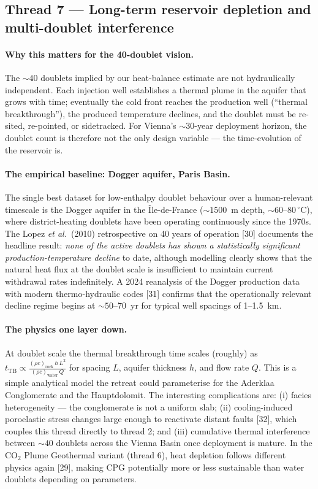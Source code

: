 \documentclass{article}
\begin{document}
\subsection*{Thread 7 --- Long-term reservoir depletion and multi-doublet interference}

\paragraph{Why this matters for the 40-doublet vision.}
The $\sim 40$ doublets implied by our heat-balance estimate are not
hydraulically independent. Each injection well establishes a thermal plume
in the aquifer that grows with time; eventually the cold front reaches
the production well (``thermal breakthrough''), the produced temperature
declines, and the doublet must be re-sited, re-pointed, or sidetracked.
For Vienna's $\sim 30$-year deployment horizon, the doublet count is
therefore not the only design variable --- the time-evolution of the
reservoir is.

\paragraph{The empirical baseline: Dogger aquifer, Paris Basin.}
The single best dataset for low-enthalpy doublet behaviour over a
human-relevant timescale is the Dogger aquifer in the \^Ile-de-France
($\sim 1500$~m depth, $\sim 60$--$80\,^\circ$C), where district-heating
doublets have been operating continuously since the 1970s. The Lopez
\emph{et al.}\ (2010) retrospective on 40 years of operation [30]
documents the headline result: \emph{none of the active doublets has
shown a statistically significant production-temperature decline} to
date, although modelling clearly shows that the natural heat flux at
the doublet scale is insufficient to maintain current withdrawal rates
indefinitely. A 2024 reanalysis of the Dogger production data with
modern thermo-hydraulic codes [31] confirms that the operationally
relevant decline regime begins at $\sim 50$--$70$~yr for typical
well spacings of 1--1.5~km.

\paragraph{The physics one layer down.}
At doublet scale the thermal breakthrough time scales (roughly) as
$t_{\mathrm{TB}} \propto \frac{(\rho c)_{\mathrm{rock}}\, h\, L^2}{(\rho c)_{\mathrm{water}}\, Q}$
for spacing $L$, aquifer thickness $h$, and flow rate $Q$. This is a
simple analytical model the retreat could parameterise for the
Aderklaa Conglomerate and the Hauptdolomit. The interesting complications
are: (i) facies heterogeneity --- the conglomerate is not a uniform slab;
(ii) cooling-induced poroelastic stress changes large enough to reactivate
distant faults [32], which couples this thread directly to thread 2; and
(iii) cumulative thermal interference between $\sim 40$ doublets across
the Vienna Basin once deployment is mature. In the CO$_2$ Plume Geothermal
variant (thread 6), heat depletion follows different physics again [29],
making CPG potentially more or less sustainable than water doublets
depending on parameters.
\end{document}
